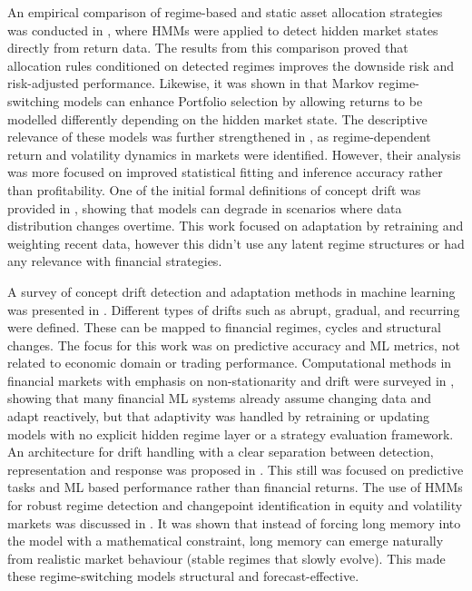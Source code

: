 \documentclass[conference]{IEEEtran}
\begin{document}
An empirical comparison of regime-based and static asset allocation strategies was conducted in \cite{b5}, where HMMs were applied to detect hidden market states directly from return data. The results from this comparison proved that allocation rules conditioned on detected regimes improves the downside risk and risk-adjusted performance. Likewise, it was shown in \cite{b6} that Markov regime-switching models can enhance Portfolio selection by allowing returns to be modelled differently depending on the hidden market state. The descriptive relevance of these models was further strengthened in \cite{b7}, as regime-dependent return and volatility dynamics in markets were identified. However, their analysis was more focused on improved statistical fitting and inference accuracy rather than profitability. One of the initial formal definitions of concept drift was provided in \cite{b8}, showing that models can degrade in scenarios where data distribution changes overtime. This work focused on adaptation by retraining and weighting recent data, however this didn't use any latent regime structures or had any relevance with financial strategies.

A survey of concept drift detection and adaptation methods in machine learning was presented in \cite{b9}. Different types of drifts such as abrupt, gradual, and recurring were defined. These can be mapped to financial regimes, cycles and structural changes. The focus for this work was on predictive accuracy and ML metrics, not related to economic domain or trading performance. Computational methods in financial markets with emphasis on non-stationarity and drift were surveyed in \cite{b10}, showing that many financial ML systems already assume changing data and adapt reactively, but that adaptivity was handled by retraining or updating models with no explicit hidden regime layer or a strategy evaluation framework. An architecture for drift handling with a clear separation between detection, representation and response was proposed in \cite{b11}. This still was focused on predictive tasks and ML based performance rather than financial returns. The use of HMMs for robust regime detection and changepoint identification in equity and volatility markets was discussed in \cite{b12}. It was shown that instead of forcing long memory into the model with a mathematical constraint, long memory can emerge naturally from realistic market behaviour (stable regimes that slowly evolve). This made these regime-switching models structural and forecast-effective.
\end{document}
